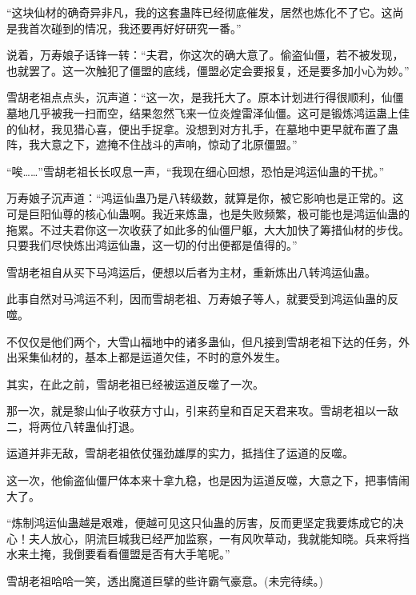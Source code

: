 \begin{this_body}
“这块仙材的确奇异非凡，我的这套蛊阵已经彻底催发，居然也炼化不了它。这尚是我首次碰到的情况，我还要再好好研究一番。”

说着，万寿娘子话锋一转：“夫君，你这次的确大意了。偷盗仙僵，若不被发现，也就罢了。这一次触犯了僵盟的底线，僵盟必定会要报复，还是要多加小心为妙。”

雪胡老祖点点头，沉声道：“这一次，是我托大了。原本计划进行得很顺利，仙僵墓地几乎被我一扫而空，结果忽然飞来一位炎煌雷泽仙僵。这可是锻炼鸿运蛊上佳的仙材，我见猎心喜，便出手捉拿。没想到对方扎手，在墓地中更早就布置了蛊阵，我大意之下，遮掩不住战斗的声响，惊动了北原僵盟。”

“唉……”雪胡老祖长长叹息一声，“我现在细心回想，恐怕是鸿运仙蛊的干扰。”

万寿娘子沉声道：“鸿运仙蛊乃是八转级数，就算是你，被它影响也是正常的。这可是巨阳仙尊的核心仙蛊啊。我近来炼蛊，也是失败频繁，极可能也是鸿运仙蛊的拖累。不过夫君你这一次收获了如此多的仙僵尸躯，大大加快了筹措仙材的步伐。只要我们尽快炼出鸿运仙蛊，这一切的付出便都是值得的。”

雪胡老祖自从买下马鸿运后，便想以后者为主材，重新炼出八转鸿运仙蛊。

此事自然对马鸿运不利，因而雪胡老祖、万寿娘子等人，就要受到鸿运仙蛊的反噬。

不仅仅是他们两个，大雪山福地中的诸多蛊仙，但凡接到雪胡老祖下达的任务，外出采集仙材的，基本上都是运道欠佳，不时的意外发生。

其实，在此之前，雪胡老祖已经被运道反噬了一次。

那一次，就是黎山仙子收获方寸山，引来药皇和百足天君来攻。雪胡老祖以一敌二，将两位八转蛊仙打退。

运道并非无敌，雪胡老祖依仗强劲雄厚的实力，抵挡住了运道的反噬。

这一次，他偷盗仙僵尸体本来十拿九稳，也是因为运道反噬，大意之下，把事情闹大了。

“炼制鸿运仙蛊越是艰难，便越可见这只仙蛊的厉害，反而更坚定我要炼成它的决心！夫人放心，阴流巨城我已经严加监察，一有风吹草动，我就能知晓。兵来将挡水来土掩，我倒要看看僵盟是否有大手笔呢。”

雪胡老祖哈哈一笑，透出魔道巨擘的些许霸气豪意。(未完待续。)

\end{this_body}

